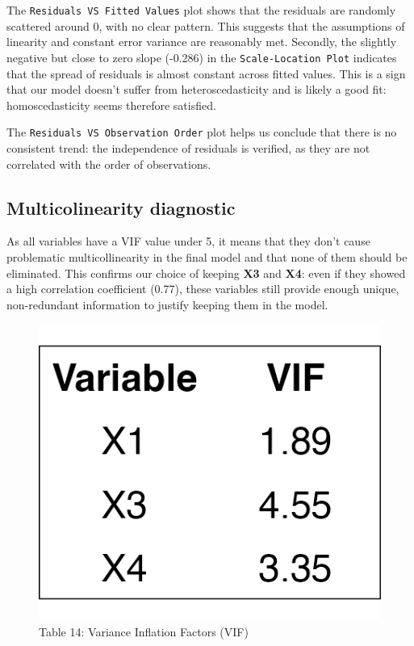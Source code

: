 \documentclass[
  12pt,
]{article}
\begin{document}
The \texttt{Residuals\ VS\ Fitted\ Values} plot shows that the residuals
are randomly scattered around 0, with no clear pattern. This suggests
that the assumptions of linearity and constant error variance are
reasonably met. Secondly, the slightly negative but close to zero slope
(-0.286) in the \texttt{Scale-Location\ Plot} indicates that the spread
of residuals is almost constant across fitted values. This is a sign
that our model doesn't suffer from heteroscedasticity and is likely a
good fit: homoscedasticity seems therefore satisfied.

The \texttt{Residuals\ VS\ Observation\ Order} plot helps us conclude
that there is no consistent trend: the independence of residuals is
verified, as they are not correlated with the order of observations.

\vspace{-0.5em}

\subsection{Multicolinearity
diagnostic}\label{multicolinearity-diagnostic}

\noindent

\begin{minipage}{0.75\textwidth}
\vspace{-0.5em}
As all variables have a VIF value under 5, it means that they don’t cause problematic multicollinearity in the final model and that none of them should be eliminated. This confirms our choice of keeping \textbf{X3} and \textbf{X4}: even if they showed a high correlation coefficient (0.77), these variables still provide enough unique, non-redundant information to justify keeping them in the model.
\end{minipage}
\hfill
\begin{minipage}{0.2\textwidth}
\vspace{-3em}
  \begin{figure}[H]
    \centering
    \includegraphics[width=0.8\linewidth]{figures/vif_table.png}
    \vspace{-0.5em}
    \captionsetup{font=normalsize}
    \caption*{Table 14: Variance Inflation Factors (VIF)}
  \end{figure}
\end{minipage}
\end{document}
